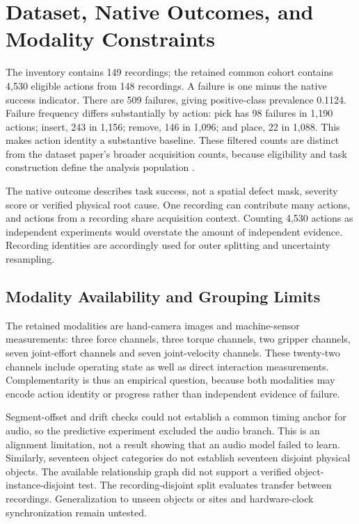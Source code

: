 \section{Dataset, Native Outcomes, and Modality Constraints}
The inventory contains 149 recordings; the retained common cohort contains 4,530
eligible actions from 148 recordings. A failure is one minus the native success
indicator. There are 509 failures, giving positive-class prevalence 0.1124. Failure
frequency differs substantially by action: pick has 98 failures in 1,190 actions;
insert, 243 in 1,156; remove, 146 in 1,096; and place, 22 in 1,088. This makes action
identity a substantive baseline. These filtered counts are distinct from the dataset
paper's broader acquisition counts, because eligibility and task construction define the
analysis population \citep{Sliwowski2025REASSEMBLE}.

The native outcome describes task success, not a spatial defect mask, severity score or
verified physical root cause. One recording can contribute many actions, and actions
from a recording share acquisition context. Counting 4,530 actions as independent
experiments would overstate the amount of independent evidence. Recording identities are
accordingly used for outer splitting and uncertainty resampling.

\subsection{Modality Availability and Grouping Limits}
The retained modalities are hand-camera images and machine-sensor measurements: three
force channels, three torque channels, two gripper channels, seven joint-effort channels
and seven joint-velocity channels. These twenty-two channels include operating state as
well as direct interaction measurements. Complementarity is thus an empirical question,
because both modalities may encode action identity or progress rather than independent
evidence of failure.

Segment-offset and drift checks could not establish a common timing anchor for audio, so
the predictive experiment excluded the audio branch. This is an alignment limitation,
not a result showing that an audio model failed to learn. Similarly, seventeen object
categories do not establish seventeen disjoint physical objects. The available
relationship graph did not support a verified object-instance-disjoint test. The
recording-disjoint split evaluates transfer between recordings. Generalization to unseen
objects or sites and hardware-clock synchronization remain untested.

